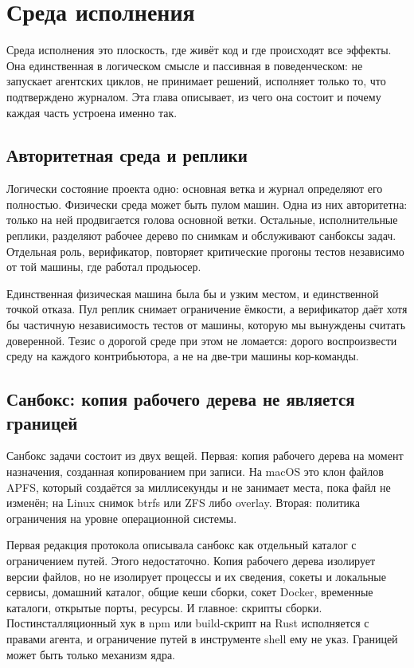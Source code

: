 \chapter{Среда исполнения}

Среда исполнения это плоскость, где живёт код и где происходят все эффекты. Она единственная в логическом смысле и пассивная в поведенческом: не запускает агентских циклов, не принимает решений, исполняет только то, что подтверждено журналом. Эта глава описывает, из чего она состоит и почему каждая часть устроена именно так.

\section{Авторитетная среда и реплики}

Логически состояние проекта одно: основная ветка и журнал определяют его полностью. Физически среда может быть пулом машин. Одна из них авторитетна: только на ней продвигается голова основной ветки. Остальные, исполнительные реплики, разделяют рабочее дерево по снимкам и обслуживают санбоксы задач. Отдельная роль, верификатор, повторяет критические прогоны тестов независимо от той машины, где работал продьюсер.

\begin{whybox}
Единственная физическая машина была бы и узким местом, и единственной точкой отказа. Пул реплик снимает ограничение ёмкости, а верификатор даёт хотя бы частичную независимость тестов от машины, которую мы вынуждены считать доверенной. Тезис о дорогой среде при этом не ломается: дорого воспроизвести среду на каждого контрибьютора, а не на две-три машины кор-команды.
\end{whybox}

\section{Санбокс: копия рабочего дерева не является границей}

Санбокс задачи состоит из двух вещей. Первая: копия рабочего дерева на момент назначения, созданная копированием при записи. На macOS это клон файлов APFS, который создаётся за миллисекунды и не занимает места, пока файл не изменён; на Linux снимок btrfs или ZFS либо overlay. Вторая: политика ограничения на уровне операционной системы.

\begin{warnbox}
Первая редакция протокола описывала санбокс как отдельный каталог с ограничением путей. Этого недостаточно. Копия рабочего дерева изолирует версии файлов, но не изолирует процессы и их сведения, сокеты и локальные сервисы, домашний каталог, общие кеши сборки, сокет Docker, временные каталоги, открытые порты, ресурсы. И главное: скрипты сборки. Постинсталляционный хук в npm или build-скрипт на Rust исполняется с правами агента, и ограничение путей в инструменте shell ему не указ. Границей может быть только механизм ядра.
\end{warnbox}

